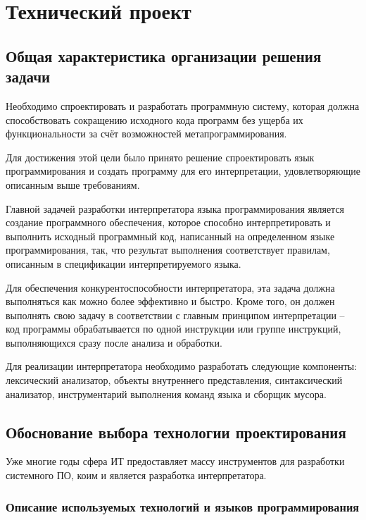 \section{Технический проект}
\subsection{Общая характеристика организации решения задачи}

Необходимо спроектировать и разработать программную систему, которая должна способствовать сокращению исходного кода программ без ущерба их функциональности за счёт возможностей метапрограммирования.

Для достижения этой цели было принято решение спроектировать язык программирования и создать программу для его интерпретации, удовлетворяющие описанным выше требованиям.

Главной задачей разработки интерпретатора языка программирования является создание программного обеспечения, которое способно интерпретировать и выполнить исходный программный код, написанный на определенном языке программирования, так, что результат выполнения соответствует правилам, описанным в спецификации интерпретируемого языка.

Для обеспечения конкурентоспособности интерпретатора, эта задача должна выполняться как можно более эффективно и быстро. Кроме того, он должен выполнять свою задачу в соответствии с главным принципом интерпретации -- код программы обрабатывается по одной инструкции или группе инструкций, выполняющихся сразу после анализа и обработки. 

Для реализации интерпретатора необходимо разработать следующие компоненты: лексический анализатор, объекты внутреннего представления, синтаксический анализатор, инструментарий выполнения команд языка и сборщик мусора.

\subsection{Обоснование выбора технологии проектирования}

Уже многие годы сфера ИТ предоставляет массу инструментов для разработки системного ПО, коим и является разработка интерпретатора.

\subsubsection{Описание используемых технологий и языков программирования}

